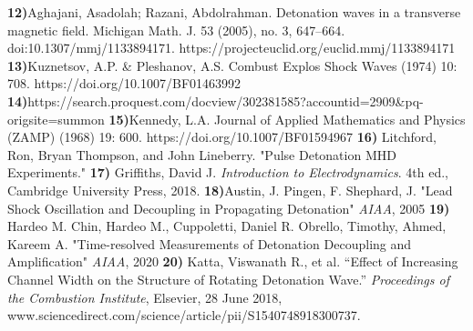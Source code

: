 \documentclass[preview,12pt]{article}
\begin{document}
\textbf{12)}Aghajani, Asadolah; Razani, Abdolrahman. Detonation waves in a transverse magnetic field. Michigan Math. J. 53 (2005), no. 3, 647--664. doi:10.1307/mmj/1133894171. https://projecteuclid.org/euclid.mmj/1133894171
\newline
\textbf{13)}Kuznetsov, A.P. & Pleshanov, A.S. Combust Explos Shock Waves (1974) 10: 708. \newline https://doi.org/10.1007/BF01463992
\newline
\textbf{14)}https://search.proquest.com/docview/302381585?accountid=2909&pq-origsite=summon
\newline
\textbf{15)}Kennedy, L.A. Journal of Applied Mathematics and Physics (ZAMP) (1968) 19: 600. https://doi.org/10.1007/BF01594967
\newline
\textbf{16)} Litchford, Ron, Bryan Thompson, and John Lineberry. "Pulse Detonation MHD Experiments."
\newline
\textbf{17)} Griffiths, David J. \textit{Introduction to Electrodynamics}. 4th ed., Cambridge University Press, 2018.
\newline
\textbf{18)}Austin, J. Pingen, F. Shephard, J. "Lead Shock Oscillation and Decoupling in Propagating Detonation" \textit{AIAA}, 2005
\newline
\textbf{19)} Hardeo M. Chin, Hardeo M., Cuppoletti, Daniel R. Obrello, Timothy, Ahmed, Kareem A. "Time-resolved Measurements of Detonation Decoupling and Amplification" \textit{AIAA}, 2020
\newline
\textbf{20)} Katta, Viswanath R., et al. “Effect of Increasing Channel Width on the Structure of Rotating Detonation Wave.” \textit{Proceedings of the Combustion Institute}, Elsevier, 28 June 2018, www.sciencedirect.com/science/article/pii/S1540748918300737. 
\end{document}
